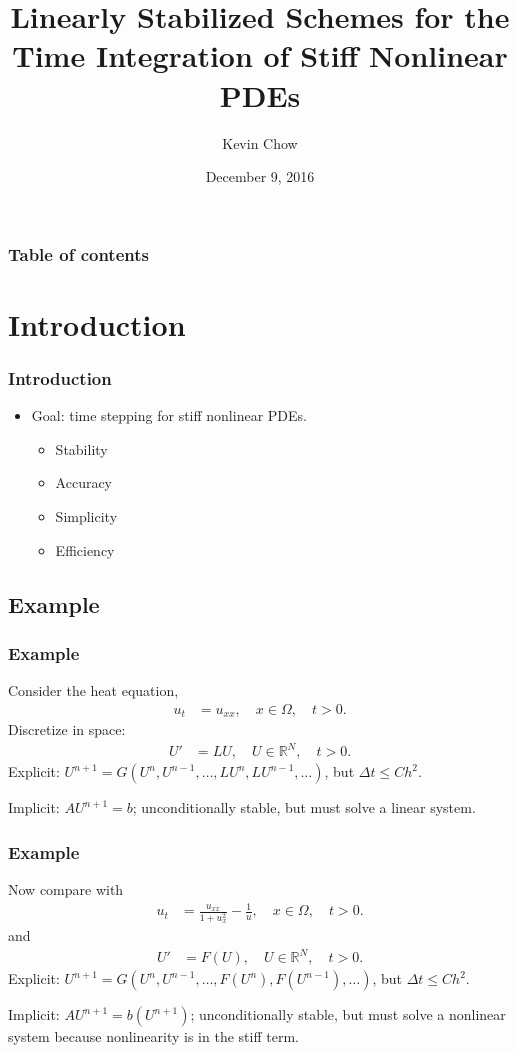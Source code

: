 \documentclass[hyperref={pdfpagelabels=false}]{beamer}
\title[Linearly Stabilized Schemes]{Linearly Stabilized Schemes for the Time Integration of Stiff Nonlinear PDEs}
\author[Kevin Chow]{Kevin Chow}
\date{December 9, 2016}
\begin{document}
\begin{frame}
\titlepage
\end{frame} 

\begin{frame}
\frametitle{Table of contents}
\tableofcontents
\end{frame} 

\section{Introduction} 
\begin{frame}
	\frametitle{Introduction}
\begin{itemize}
	\item Goal: time stepping for stiff nonlinear PDEs.
	\begin{itemize}
		\item Stability
		\item Accuracy
		\item Simplicity
		\item Efficiency
	\end{itemize}
\end{itemize}
\end{frame}

\subsection{Example}
\begin{frame}
	\frametitle{Example}
Consider the heat equation, 
	\begin{align*}
		u_t &= u_{xx}, \quad x \in \Omega, \quad t > 0.
	\end{align*}
Discretize in space:
	\begin{align*}
		U' &= LU, \quad U \in \mathbb{R}^N, \quad t > 0.
	\end{align*}
Explicit: $U^{n+1} = G(U^n,U^{n-1},\dots, LU^n, LU^{n-1},\dots)$, but $\Delta t \leq Ch^2$. 

Implicit: $AU^{n+1} = b$; unconditionally stable, but must solve a linear system. 
\end{frame}

\begin{frame}
	\frametitle{Example}
Now compare with 
	\begin{align*}
		u_t &= \frac{u_{xx}}{1 + u_x^2} - \frac{1}{u}, \quad x \in \Omega, \quad t > 0.
	\end{align*}
and 
	\begin{align*} 
		U' &= F(U), \quad U \in \mathbb{R}^N, \quad t > 0.
	\end{align*}
Explicit: $U^{n+1} = G(U^n,U^{n-1},\dots, F(U^n), F(U^{n-1}),\dots)$, but $\Delta t \leq Ch^2$. 

Implicit: $AU^{n+1} = b(U^{n+1})$; unconditionally stable, but must solve a nonlinear system because nonlinearity is in the stiff term. 
\end{frame}
\end{document}
